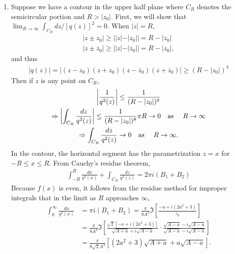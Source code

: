 \documentclass[a4paper,12pt]{article}
\begin{document}
\begin{enumerate}
\begin{enumerate}
            \item
                Suppose we have a contour in the upper half plane where $C_R$ denotes the semicircular portion and $R > |z_0|$. First, we will show that $\lim_{R \to \infty} \int_{C_R} dz / [q(z)]^2 = 0$. When $|z| = R$,
                \begin{gather*}
                    |z \pm z_0| \geq ||z| - |z_0|| = R - |z_0| \\
                    |z \pm \overline{z}_0| \geq ||z| - |\overline{z}_0|| = R - |z_0|,
                \end{gather*}
                and thus
                \begin{gather*}
                    |q(z)| = |(z - z_0)(z + z_0)(z - \overline{z}_0)(z + \overline{z}_0)| \geq (R - |z_0|)^4
                \end{gather*}
                Then if $z$ is any point on $C_R$,
                \begin{gather*}
                    \left| \frac{1}{q^2(z)} \right| \leq \frac{1}{(R - |z_0|)^8} \\
                    \Rightarrow \left| \int_{C_R} \frac{dz}{q^2(z)} \right| \leq \frac{1}{(R - |z_0|)^8} \pi R \to 0 \text{\quad as \quad} R \to \infty \\
                    \Rightarrow \int_{C_R} \frac{dz}{q^2(z)} \to 0 \text{\quad as \quad} R \to \infty.
                \end{gather*}
                In the contour, the horizontal segment has the parametrization $z = x$ for $-R \leq x \leq R$. From Cauchy's residue theorem,
                \begin{align*}
                    \int_{-R}^R \frac{dx}{q^2(x)} + \int_{C_R} \frac{dz}{q^2(z)} = 2\pi i(B_1 + B_2)
                \end{align*}
                Because $f(x)$ is even, it follows from the residue method for improper integrals that in the limit as $R$ approaches $\infty$,
                \begin{align*}
                    \int_0^\infty \frac{dx}{q^2(x)} &= \pi i \left( B_1 + B_2 \right) = \frac{\pi}{8A^2} \Im \left[ \frac{-a + i(2a^2 + 3)}{z_0} \right] \\
                    &= \frac{\pi}{8A^2} \Im \left[ \frac{\sqrt{2} [-a + i(2a^2 + 3)]}{\sqrt{A + a} + i\sqrt{A - a}} \cdot \frac{\sqrt{A - a} - i\sqrt{A - a}}{\sqrt{A - a} - i\sqrt{A - a}} \right] \\
                    &= \frac{\pi}{8\sqrt{2} A^3} \left[ (2a^2 + 3) \sqrt{A + a} + a \sqrt{A - a} \right].
                \end{align*}
        \end{enumerate}
\end{enumerate}
\end{document}
